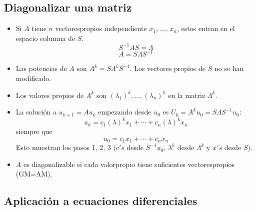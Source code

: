 \documentclass[]{article}
\begin{document}
\subsection{Diagonalizar una matriz}

\begin{itemize}
	\item Si $ A $ tiene $ n $ vectorespropios independiente $ x_{1},...,\ x_{n} $, estos entran en el espacio columna de $ S $.\\
	\[
	S^{-1}AS=\Lambda 
	\] 
	\[
	A=S\Lambda S^{-1}
	\] 
	
	\item Las potencias de $ A $ son $ A^{k}=S \Lambda^{k}S^{-1} $. Los vectores propios de $ S $ no se han modificado. 
	
	\item Los valores propios de $ A^{k} $ son $ (\lambda_{1})^{k},...,(\lambda_{n})^{k} $ en la matriz $ \Lambda^{k} $.
	
	\item La soluci\'on a $ u_{k+1}=Au_{k} $ empezando desde $ u_{0} $ es $ U_{k}=A^{k}u_{0}=S\Lambda S^{-1}u_{0} $: 
	\[
	u_{k}=c_{1}(\lambda)^{k}x_{1}+\cdots+c_{n}(\lambda)^{k}x_{n}
	\]
	siempre que 
	\[
	u_{0}=c_{1}x_{1}+\cdots+c_{n}x_{n}
	\]
	Esto muestran los pasos 1, 2, 3 ($ c's $ desde $ S^{-1}u_{0} $, $ \lambda^{k} $ desde $ \Lambda^{k} $ y $ x's $ desde $ S $).
	
	\item $ A $ es diagonalizable si cada valorpropio tiene suficientes vectorespropios (GM=AM). 
	
\end{itemize}

\subsection{Aplicaci\'on a ecuaciones diferenciales}
\end{document}
